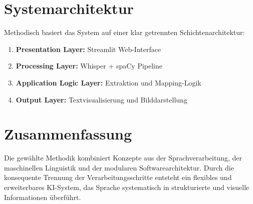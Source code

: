 \section{Systemarchitektur}
Methodisch basiert das System auf einer klar getrennten Schichtenarchitektur:

\begin{enumerate}
    \item \textbf{Presentation Layer:} Streamlit Web-Interface
    \item \textbf{Processing Layer:} Whisper + spaCy Pipeline
    \item \textbf{Application Logic Layer:} Extraktion und Mapping-Logik
    \item \textbf{Output Layer:} Textvisualisierung und Bilddarstellung
\end{enumerate}

\section{Zusammenfassung}
Die gewählte Methodik kombiniert Konzepte aus der Sprachverarbeitung, der maschinellen Linguistik und der modularen Softwarearchitektur. Durch die konsequente Trennung der Verarbeitungsschritte entsteht ein flexibles und erweiterbares KI-System, das Sprache systematisch in strukturierte und visuelle Informationen überführt.